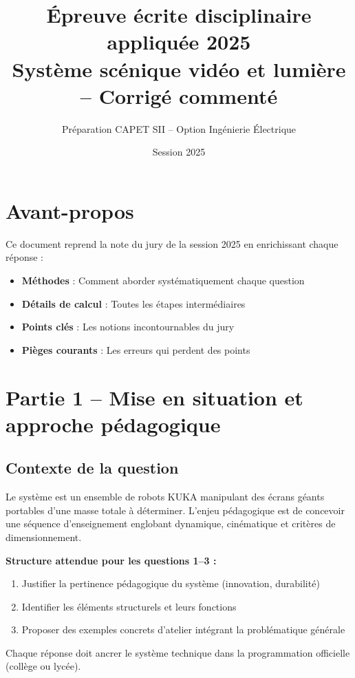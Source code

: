 \documentclass[12pt,a4paper,twoside]{article}
\title{\textbf{Épreuve écrite disciplinaire appliquée 2025}\\
\large Système scénique vidéo et lumière -- Corrigé commenté}
\author{Préparation CAPET SII -- Option Ingénierie Électrique}
\date{Session 2025}
\begin{document}
\maketitle
\tableofcontents
\newpage

\section*{Avant-propos}
Ce document reprend la note du jury de la session 2025 en enrichissant chaque réponse :
\begin{itemize}
  \item \textbf{Méthodes} : Comment aborder systématiquement chaque question
  \item \textbf{Détails de calcul} : Toutes les étapes intermédiaires
  \item \textbf{Points clés} : Les notions incontournables du jury
  \item \textbf{Pièges courants} : Les erreurs qui perdent des points
\end{itemize}

\newpage

\section{Partie 1 -- Mise en situation et approche pédagogique}

\subsection*{Contexte de la question}
Le système est un ensemble de robots KUKA manipulant des écrans géants portables d'une masse totale à déterminer. L'enjeu pédagogique est de concevoir une séquence d'enseignement englobant dynamique, cinématique et critères de dimensionnement.

\begin{methode}
  \textbf{Structure attendue pour les questions 1--3 :}
  \begin{enumerate}
    \item Justifier la pertinence pédagogique du système (innovation, durabilité)
    \item Identifier les éléments structurels et leurs fonctions
    \item Proposer des exemples concrets d'atelier intégrant la problématique générale
  \end{enumerate}

  Chaque réponse doit ancrer le système technique dans la programmation officielle (collège ou lycée).
\end{methode}
\end{document}
